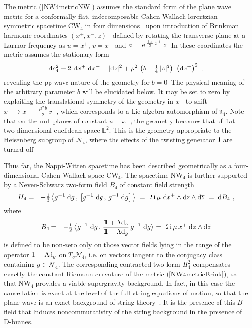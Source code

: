\documentclass[11pt,a4paper]{article}
\newcommand{\ii}{{\rm i}}
\def\ii{{\,{\rm i}\,}}
\def\dd{{\rm d}}
\def\J{{\sf J}}
\newcommand{\eucl}{{\mathbb E}}
\newcommand{\id}{{1\!\!1}} %
\def\e{{\,\rm e}\,}
\newcommand{\beq}{\begin{eqnarray}}
\newcommand{\eeq}{\end{eqnarray}}
\begin{document}
The metric (\ref{NW4metricNW}) assumes the standard form of the plane
wave metric for a conformally flat, indecomposable Cahen-Wallach
lorentzian symmetric spacetime CW$_4$ in four dimensions~\cite{CW1} upon
introduction of Brinkman harmonic coordinates
$(x^+,x^-,z)$~\cite{Brink1} defined by rotating the transverse plane at
a Larmor frequency as $u=x^+$, $v=x^-$ and
$a=\e^{\frac{\ii\mu}2\,x^+}\,z$. In these coordinates the metric
assumes the stationary form
\beq
\dd s_4^2=2~\dd x^+~\dd x^-+|\dd z|^2+\mu^2\,
\left(b-\mbox{$\frac14$}\,|z|^2\right)~
\left(\dd x^+\right)^2 \ ,
\label{NW4metricBrink}\eeq
revealing the pp-wave nature of the geometry for $b=0$. The physical
meaning of the arbitrary parameter $b$ will be elucidated below. It
may be set to zero by exploiting the translational symmetry of the
geometry in $x^-$ to shift $x^-\to x^--\frac{\mu^2\,b}2\,x^+$, which
corresponds to a Lie algebra automorphism of $\mathfrak n_4$. Note
that on the null planes of constant $u=x^+$, the geometry becomes that of
flat two-dimensional euclidean space $\eucl^2$. This is the geometry
appropriate to the Heisenberg subgroup of $\mathcal{N}_4$, where the
effects of the twisting generator $\J$ are turned off.

Thus far, the Nappi-Witten spacetime has been described geometrically
as a four-dimensional Cahen-Wallach space CW$_4$. The spacetime NW$_4$
is further supported by a Neveu-Schwarz two-form field $B_4$ of constant
field strength
\beq
H_4&=&-\mbox{$\frac13$}\,\bigl\langle g^{-1}~\dd g\,,\,
\left[g^{-1}~\dd g\,,\,g^{-1}~\dd g\right]\bigl\rangle
{}~=~2\ii\mu~\dd x^+\wedge\dd z\wedge\dd\overline{z}~=~\dd B_4 \ ,
\label{NS3formBrink}\eeq
where
\beq
B_4&=&-\mbox{$\frac12$}\,\bigl\langle g^{-1}~\dd g\,,\,
\frac{\id+{\rm Ad}_g}{\id-{\rm Ad}_g}\,g^{-1}~\dd g\bigl\rangle~=~
2\ii\mu\,x^+~\dd z\wedge\dd\overline{z}
\label{NS2formBrink}\eeq
is defined to be non-zero only on those vector fields lying in the
range of the operator $\id-{\rm Ad}_g$ on $T_g\mathcal{N}_4$, i.e. on
vectors tangent to the conjugacy class containing
$g\in\mathcal{N}_4$. The corresponding contracted two-form $H_4^2$
compensates exactly the constant Riemann curvature of the metric
(\ref{NW4metricBrink}), so that NW$_4$ provides a viable supergravity
background. In fact, in this case the cancellation is exact at the
level of the full string equations of motion, so that the plane wave
is an exact background of string theory~\cite{NW1}. It is the presence of
this $B$-field that induces noncommutativity of the string background
in the presence of D-branes.
\end{document}
